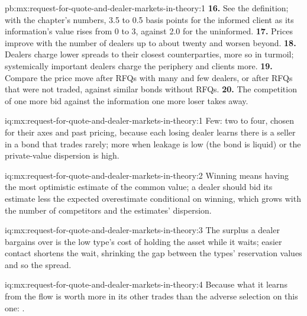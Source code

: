 \begin{solution}{pb:mx:request-for-quote-and-dealer-markets-in-theory:1}
\textbf{16.} See the definition; with the chapter's numbers, 3.5 to 0.5 basis points for the informed client as its information's value rises from 0 to
3, against 2.0 for the uninformed.
\textbf{17.} Prices improve with the number of dealers up to about twenty and worsen beyond.
\textbf{18.} Dealers charge lower spreads to their closest counterparties, more so in turmoil; systemically important dealers charge the periphery and
clients more.
\textbf{19.} Compare the price move after RFQs with many and few dealers, or after RFQs that were not traded, against similar bonds without RFQs.
\textbf{20.} The competition of one more bid against the information one more loser takes away.
\end{solution}

\begin{solution}{iq:mx:request-for-quote-and-dealer-markets-in-theory:1}
Few: two to four, chosen for their axes and past pricing, because each losing dealer learns there is a seller in a bond that trades rarely; more when
leakage is low (the bond is liquid) or the private-value dispersion is high.
\end{solution}

\begin{solution}{iq:mx:request-for-quote-and-dealer-markets-in-theory:2}
Winning means having the most optimistic estimate of the common value; a dealer should bid its estimate less the expected overestimate conditional
on winning, which grows with the number of competitors and the estimates' dispersion.
\end{solution}

\begin{solution}{iq:mx:request-for-quote-and-dealer-markets-in-theory:3}
The surplus a dealer bargains over is the low type's cost of holding the asset while it waits; easier contact shortens the wait, shrinking the gap
between the types' reservation values and so the spread.
\end{solution}

\begin{solution}{iq:mx:request-for-quote-and-dealer-markets-in-theory:4}
Because what it learns from the flow is worth more in its other trades than the adverse selection on this one: .
\end{solution}

